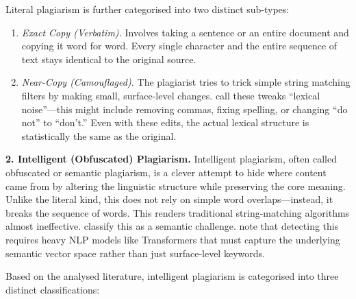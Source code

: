 \documentclass[12pt, a4paper]{article}
\begin{document}
Literal plagiarism is further categorised into two distinct sub-types:
\begin{enumerate}
	\item \textit{Exact Copy (Verbatim).} Involves taking a sentence or an entire document and copying it word for word. Every single character and the entire sequence of text stays identical to the original source.
	\item \textit{Near-Copy (Camouflaged).} The plagiarist tries to trick simple string matching filters by making small, surface-level changes. \citet{Lieharyani2025} call these tweaks ``lexical noise''---this might include removing commas, fixing spelling, or changing ``do not'' to ``don't.'' Even with these edits, the actual lexical structure is statistically the same as the original.
\end{enumerate}

\textbf{2. Intelligent (Obfuscated) Plagiarism.}
Intelligent plagiarism, often called obfuscated or semantic plagiarism, is a clever attempt to hide where content came from by altering the linguistic structure while preserving the core meaning. Unlike the literal kind, this does not rely on simple word overlaps---instead, it breaks the sequence of words. This renders traditional string-matching algorithms almost ineffective. \citet{Amirzhanov2025} classify this as a semantic challenge. \citet{Sajid2025} note that detecting this requires heavy NLP models like Transformers that must capture the underlying semantic vector space rather than just surface-level keywords.

Based on the analysed literature, intelligent plagiarism is categorised into three distinct classifications:
\end{document}

